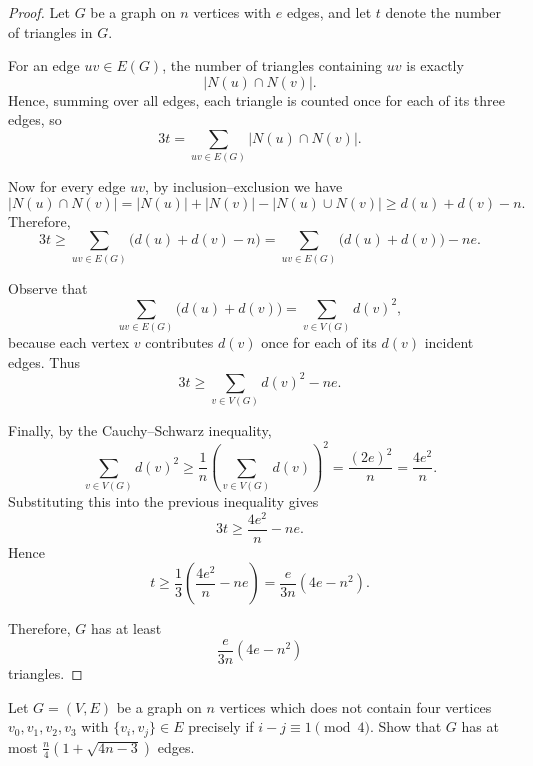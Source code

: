 \documentclass[11pt, a4paper]{ctexrep}
\begin{document}
\begin{proof}
    Let \(G\) be a graph on \(n\) vertices with \(e\) edges, and let \(t\) denote the number of triangles in \(G\).

    For an edge \(uv\in E(G)\), the number of triangles containing \(uv\) is exactly
    \[
        |N(u)\cap N(v)|.
    \]
    Hence, summing over all edges, each triangle is counted once for each of its three edges, so
    \[
        3t=\sum_{uv\in E(G)} |N(u)\cap N(v)|.
    \]

    Now for every edge \(uv\), by inclusion--exclusion we have
    \[
        |N(u)\cap N(v)|
        =|N(u)|+|N(v)|-|N(u)\cup N(v)|
        \ge d(u)+d(v)-n.
    \]
    Therefore,
    \[
        3t
        \ge \sum_{uv\in E(G)} \bigl(d(u)+d(v)-n\bigr)
        = \sum_{uv\in E(G)} \bigl(d(u)+d(v)\bigr)-ne.
    \]

    Observe that
    \[
        \sum_{uv\in E(G)} \bigl(d(u)+d(v)\bigr)=\sum_{v\in V(G)} d(v)^2,
    \]
    because each vertex \(v\) contributes \(d(v)\) once for each of its \(d(v)\) incident edges. Thus
    \[
        3t \ge \sum_{v\in V(G)} d(v)^2-ne.
    \]

    Finally, by the Cauchy--Schwarz inequality,
    \[
        \sum_{v\in V(G)} d(v)^2
        \ge \frac{1}{n}\left(\sum_{v\in V(G)} d(v)\right)^2
        = \frac{(2e)^2}{n}
        = \frac{4e^2}{n}.
    \]
    Substituting this into the previous inequality gives
    \[
        3t \ge \frac{4e^2}{n}-ne.
    \]
    Hence
    \[
        t \ge \frac{1}{3}\left(\frac{4e^2}{n}-ne\right)
        = \frac{e}{3n}(4e-n^2).
    \]

    Therefore, \(G\) has at least
    \[
        \frac{e}{3n}(4e-n^2)
    \]
    triangles.
\end{proof}

\begin{exercise}
    Let $G = (V, E)$ be a graph on $n$ vertices which does not contain four vertices $v_0, v_1, v_2, v_3$ with $\{v_i, v_j\} \in E$ precisely if $i - j \equiv 1 \pmod{4}$. Show that $G$ has at most $\frac{n}{4}(1 + \sqrt{4n - 3})$ edges.
\end{exercise}
\end{document}
